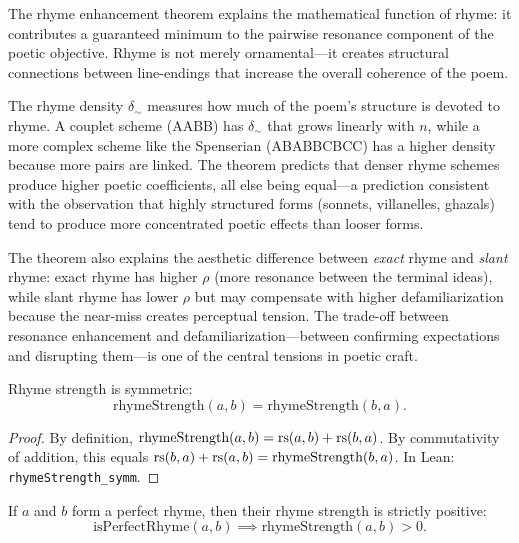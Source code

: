 \begin{interpretation}
\label{interp:rhyme}
The rhyme enhancement theorem explains the mathematical function of rhyme:
it contributes a guaranteed minimum to the pairwise resonance component of the
poetic objective.  Rhyme is not merely ornamental---it creates structural
connections between line-endings that increase the overall coherence of the
poem.

The rhyme density $\delta_\sim$ measures how much of the poem's structure is
devoted to rhyme.  A couplet scheme (AABB) has $\delta_\sim$ that grows linearly
with $n$, while a more complex scheme like the Spenserian (ABABBCBCC) has a
higher density because more pairs are linked.  The theorem predicts that
denser rhyme schemes produce higher poetic coefficients, all else being equal---a
prediction consistent with the observation that highly structured forms
(sonnets, villanelles, ghazals) tend to produce more concentrated poetic
effects than looser forms.

The theorem also explains the aesthetic difference between \emph{exact} rhyme
and \emph{slant} rhyme: exact rhyme has higher $\rho$ (more resonance between
the terminal ideas), while slant rhyme has lower $\rho$ but may compensate with
higher defamiliarization because the near-miss creates perceptual tension.  The
trade-off between resonance enhancement and defamiliarization---between
confirming expectations and disrupting them---is one of the central tensions in
poetic craft.
\end{interpretation}


\begin{theorem}
\label{thm:rhyme-symm}
Rhyme strength is symmetric:
\[
  \text{rhymeStrength}(a, b) = \text{rhymeStrength}(b, a).
\]
\end{theorem}

\begin{proof}
By definition, $\text{rhymeStrength}(a, b) = \mathrm{rs}(a, b) + \mathrm{rs}(b, a)$.  By commutativity of addition, this equals $\mathrm{rs}(b, a) + \mathrm{rs}(a, b) = \text{rhymeStrength}(b, a)$.  In Lean: \texttt{rhymeStrength\_symm}.
\end{proof}

\begin{theorem}
\label{thm:perfect-rhyme-pos}
If $a$ and $b$ form a perfect rhyme, then their rhyme strength is strictly positive:
\[
  \text{isPerfectRhyme}(a, b) \implies \text{rhymeStrength}(a, b) > 0.
\]
\end{theorem}

